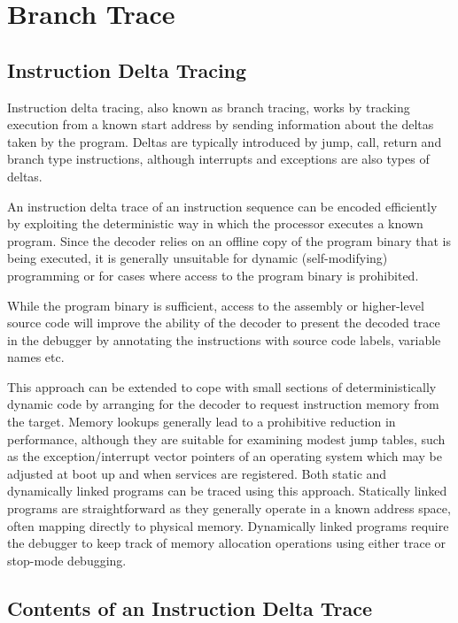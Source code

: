\chapter{Branch Trace} \label{Branch Trace}


\section{Instruction Delta Tracing} \label{Delta Tracing}

Instruction delta tracing, also known as branch tracing, works by
tracking execution from a known start address by sending information
about the deltas taken by the program. Deltas are typically introduced
by jump, call, return and branch type instructions, although
interrupts and exceptions are also types of deltas.

An instruction delta trace of an instruction sequence can be encoded
efficiently by exploiting the deterministic way in which the processor
executes a known program. Since the decoder relies on an offline copy
of the program binary that is being executed, it is generally unsuitable
for dynamic (self-modifying) programming or for cases where access to
the program binary is prohibited.

While the program binary is sufficient, access to the assembly or
higher-level source code will improve the ability of the decoder to present
the decoded trace in the debugger by annotating the instructions with
source code labels, variable names etc.

This approach can be extended to cope with small sections of
deterministically dynamic code by arranging for the decoder to request
instruction memory from the target. Memory lookups generally lead to a
prohibitive reduction in performance, although they are suitable for
examining modest jump tables, such as the exception/interrupt vector
pointers of an operating system which may be adjusted at boot up and
when services are registered.  Both static and dynamically linked
programs can be traced using this approach. Statically linked programs
are straightforward as they generally operate in a known address
space, often mapping directly to physical memory. Dynamically linked
programs require the debugger to keep track of memory allocation
operations using either trace or stop-mode debugging.

\section{Contents of an Instruction Delta Trace} \label{Trace Contents}

